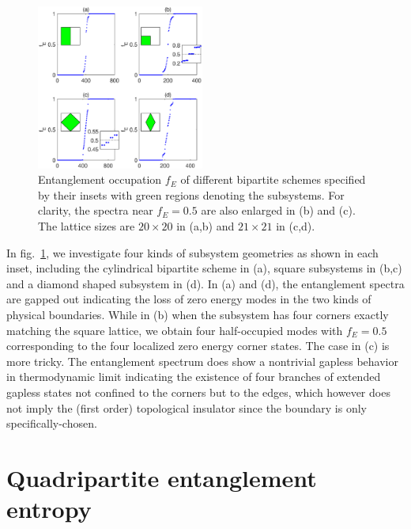 \documentclass[doublecol]{epl2} %
\begin{document}
\begin{figure}
    \includegraphics[width=0.49\textwidth]{subshape.eps}
    \caption{\label{fig:subshape} Entanglement occupation $f_E$ of different bipartite schemes specified by their insets with green regions denoting the subsystems. For clarity, the spectra near $f_E=0.5$ are also enlarged in (b) and (c). The lattice sizes are $20\times20$ in (a,b) and $21\times21$ in (c,d).}
\end{figure}

In fig.~\ref{fig:subshape}, we investigate four kinds of subsystem geometries as shown in each inset, including the cylindrical bipartite scheme in (a), square subsystems in (b,c) and a diamond shaped subsystem in (d). In (a) and (d), the entanglement spectra are gapped out indicating the loss of zero energy modes in the two kinds of physical boundaries. While in (b) when the subsystem has four corners exactly matching the square lattice, we obtain four half-occupied modes with $f_{E}=0.5$ corresponding to the four localized zero energy corner states. The case in (c) is more tricky. The entanglement spectrum does show a nontrivial gapless behavior in thermodynamic limit indicating the existence of four branches of extended gapless states not confined to the corners but to the edges, which however does not imply the (first order)  topological insulator since the boundary is only specifically-chosen. 

\section{Quadripartite entanglement entropy}
\end{document}
